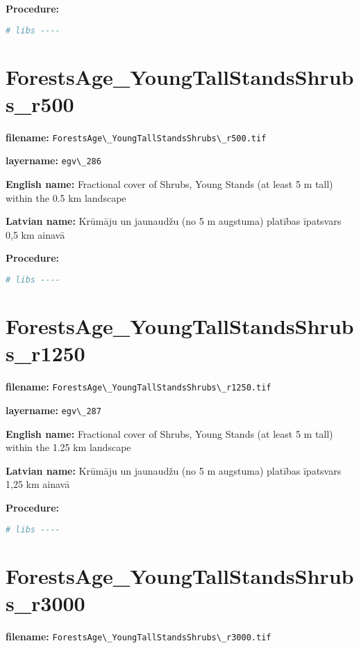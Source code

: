 \documentclass[
]{book}
\newcommand{\passthrough}[1]{#1}
\begin{document}
\textbf{Procedure:}

\begin{lstlisting}[language=R]
# libs ----
\end{lstlisting}

\section{ForestsAge\_YoungTallStandsShrubs\_r500}\label{ch06.286}

\textbf{filename:} \passthrough{\lstinline!ForestsAge\_YoungTallStandsShrubs\_r500.tif!}

\textbf{layername:} \passthrough{\lstinline!egv\_286!}

\textbf{English name:} Fractional cover of Shrubs, Young Stands (at least 5 m tall) within the 0.5 km landscape

\textbf{Latvian name:} Krūmāju un jaunaudžu (no 5 m augstuma) platības īpatsvars 0,5 km ainavā

\textbf{Procedure:}

\begin{lstlisting}[language=R]
# libs ----
\end{lstlisting}

\section{ForestsAge\_YoungTallStandsShrubs\_r1250}\label{ch06.287}

\textbf{filename:} \passthrough{\lstinline!ForestsAge\_YoungTallStandsShrubs\_r1250.tif!}

\textbf{layername:} \passthrough{\lstinline!egv\_287!}

\textbf{English name:} Fractional cover of Shrubs, Young Stands (at least 5 m tall) within the 1.25 km landscape

\textbf{Latvian name:} Krūmāju un jaunaudžu (no 5 m augstuma) platības īpatsvars 1,25 km ainavā

\textbf{Procedure:}

\begin{lstlisting}[language=R]
# libs ----
\end{lstlisting}

\section{ForestsAge\_YoungTallStandsShrubs\_r3000}\label{ch06.288}

\textbf{filename:} \passthrough{\lstinline!ForestsAge\_YoungTallStandsShrubs\_r3000.tif!}
\end{document}

